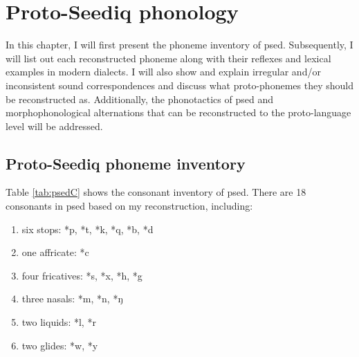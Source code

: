 \chapter{Proto-Seediq phonology}\label{ch4}

In this chapter, I will first present the phoneme inventory of \acl{psed}. Subsequently, I will list out each reconstructed phoneme along with their reflexes and lexical examples in modern dialects. I will also show and explain irregular and/or inconsistent sound correspondences and discuss what proto-phonemes they should be reconstructed as. Additionally, the phonotactics of \acl{psed} and morphophonological alternations that can be reconstructed to the proto-language level will be addressed.

\section{Proto-Seediq phoneme inventory}

Table \ref{tab:psedC} shows the consonant inventory of \acl{psed}. There are 18 consonants in \acl{psed} based on my reconstruction, including:

\begin{enumerate}[label=(\roman*), itemsep=0pt, topsep=0pt]
    \item six stops: *p, *t, *k, *q, *b, *d
    \item one affricate: *c
    \item four fricatives: *s, *x, *h, *g
    \item three nasals: *m, *n, *ŋ
    \item two liquids: *l, *r
    \item two glides: *w, *y
\end{enumerate}

